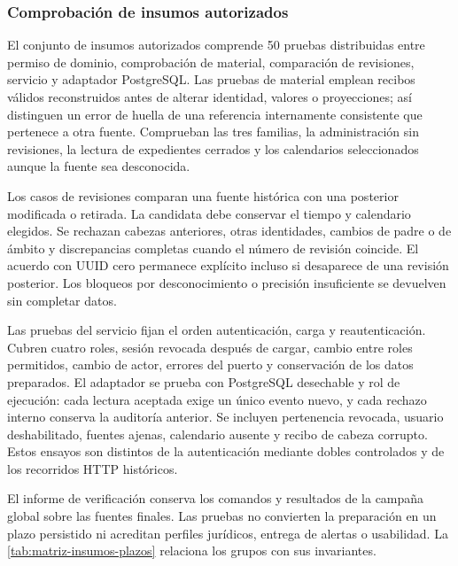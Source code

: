 \subsubsection{Comprobación de insumos autorizados}\label{sec:pruebas-insumos-plazos}

El conjunto de insumos autorizados comprende 50 pruebas distribuidas entre permiso de dominio, comprobación de material, comparación de revisiones, servicio y adaptador PostgreSQL. Las pruebas de material emplean recibos válidos reconstruidos antes de alterar identidad, valores o proyecciones; así distinguen un error de huella de una referencia internamente consistente que pertenece a otra fuente. Comprueban las tres familias, la administración sin revisiones, la lectura de expedientes cerrados y los calendarios seleccionados aunque la fuente sea desconocida.

Los casos de revisiones comparan una fuente histórica con una posterior modificada o retirada. La candidata debe conservar el tiempo y calendario elegidos. Se rechazan cabezas anteriores, otras identidades, cambios de padre o de ámbito y discrepancias completas cuando el número de revisión coincide. El acuerdo con UUID cero permanece explícito incluso si desaparece de una revisión posterior. Los bloqueos por desconocimiento o precisión insuficiente se devuelven sin completar datos.

Las pruebas del servicio fijan el orden autenticación, carga y reautenticación. Cubren cuatro roles, sesión revocada después de cargar, cambio entre roles permitidos, cambio de actor, errores del puerto y conservación de los datos preparados. El adaptador se prueba con PostgreSQL desechable y rol de ejecución: cada lectura aceptada exige un único evento nuevo, y cada rechazo interno conserva la auditoría anterior. Se incluyen pertenencia revocada, usuario deshabilitado, fuentes ajenas, calendario ausente y recibo de cabeza corrupto. Estos ensayos son distintos de la autenticación mediante dobles controlados y de los recorridos HTTP históricos.

El informe de verificación conserva los comandos y resultados de la campaña global sobre las fuentes finales. Las pruebas no convierten la preparación en un plazo persistido ni acreditan perfiles jurídicos, entrega de alertas o usabilidad. La \cref{tab:matriz-insumos-plazos} relaciona los grupos con sus invariantes.
